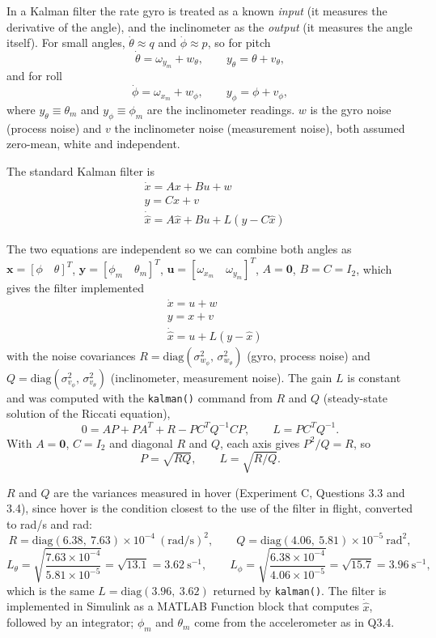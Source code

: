 \documentclass[10pt,a4paper]{article}
\newenvironment{answer}{%
  \begin{tcolorbox}[breakable,enhanced,colback=white,colframe=greyline,
    boxrule=0.6pt,arc=2pt,left=8pt,right=8pt,top=7pt,bottom=7pt,
    before skip=0pt,after skip=12pt]
}{\end{tcolorbox}}
\begin{document}
\begin{answer}
In a Kalman filter the rate gyro is treated as a known
\emph{input} (it measures the derivative of the angle), and the
inclinometer as the \emph{output} (it measures the angle itself).
For small angles, $\dot\theta\approx q$ and $\dot\phi\approx p$, so for
pitch
\[
  \dot\theta=\omega_{y_m}+w_\theta,\qquad
  y_\theta=\theta+v_\theta ,
\]
and for roll
\[
  \dot\phi=\omega_{x_m}+w_\phi,\qquad
  y_\phi=\phi+v_\phi ,
\]
where $y_\theta\equiv\theta_m$ and $y_\phi\equiv\phi_m$ are the
inclinometer readings. $w$ is the gyro noise (process noise) and $v$ the
inclinometer noise (measurement noise), both assumed zero-mean, white and
independent.

The standard Kalman filter is
\[
\begin{aligned}
&\dot{x} = Ax + Bu + w\\
&y = Cx + v\\
&\dot{\hat{x}} = A\hat{x} + Bu + L(y - C\hat{x})
\end{aligned}
\]

The two equations are independent so we can combine both angles as
$\mathbf{x} = [\phi \quad \theta]^T$, $\mathbf{y} = [\phi_m \quad \theta_m]^T$,
$\mathbf{u} = [\omega_{x_m} \quad \omega_{y_m}]^T$, $A = \mathbf{0}$,
$B = C = I_2$, which gives the filter implemented
\[
\begin{aligned}
&\dot{x} = u + w\\
&y = x + v\\
&\dot{\hat{x}} = u + L(y - \hat{x})
\end{aligned}
\]
with the noise covariances
$R = \mathrm{diag}(\sigma^2_{w_\phi},\, \sigma^2_{w_\theta})$ (gyro, process noise) and
$Q = \mathrm{diag}(\sigma^2_{v_\phi},\, \sigma^2_{v_\theta})$ (inclinometer, measurement noise).
The gain $L$ is constant and was computed with the \texttt{kalman()}
command from $R$ and $Q$ (steady-state solution of the Riccati equation),
\[
  0 = AP + PA^T + R - PC^TQ^{-1}CP, \qquad L = PC^TQ^{-1}.
\]
With $A=\mathbf{0}$, $C=I_2$ and diagonal $R$ and $Q$, each axis gives
$P^2/Q = R$, so
\[
  P = \sqrt{RQ}, \qquad L = \sqrt{R/Q}.
\]

$R$ and $Q$ are the variances measured in hover (Experiment C, Questions
3.3 and 3.4), since hover is the condition closest to the use of the
filter in flight, converted to rad/s and rad:
\[
  R = \mathrm{diag}(6.38,\ 7.63)\times10^{-4}\ (\mathrm{rad/s})^2, \qquad
  Q = \mathrm{diag}(4.06,\ 5.81)\times10^{-5}\ \mathrm{rad}^2,
\]
\[
  L_\theta = \sqrt{\frac{7.63\times10^{-4}}{5.81\times10^{-5}}} = \sqrt{13.1} = 3.62\ \mathrm{s}^{-1},
  \qquad
  L_\phi = \sqrt{\frac{6.38\times10^{-4}}{4.06\times10^{-5}}} = \sqrt{15.7} = 3.96\ \mathrm{s}^{-1},
\]
which is the same $L = \mathrm{diag}(3.96,\ 3.62)$ returned by
\texttt{kalman()}. The filter is implemented in Simulink as a MATLAB
Function block that computes $\dot{\hat{x}}$, followed by an integrator;
$\phi_m$ and $\theta_m$ come from the accelerometer as in Q3.4.


\end{answer}
\end{document}
